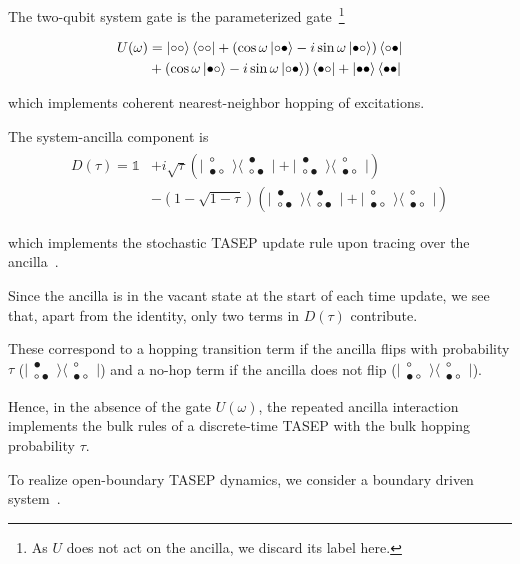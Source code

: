 \documentclass[aps,prl,twocolumn,groupedaddress,superscriptaddress,colorlinks,bookmarks=false,citecolor=darkspringgreen,linkcolor=darkolivegreen,urlcolor=navyblue]{revtex4-1}
\newcommand{\threestate}[3]{
\begin{matrix}
#1\\[-.25cm]
#2#3
\end{matrix}
}
\newcommand{\kett}[1]{\lvert #1 \rangle}
\newcommand{\brat}[1]{\langle #1 \rvert}
\begin{document}
The two-qubit system gate is the parameterized gate~\footnote{As $U$ does not act on the ancilla, we discard its label here.}


\begin{align}
\begin{split}
U(\omega)
&=\ket{\circ\circ}\bra{\circ\circ}+ (\cos\omega \ket{\circ\bullet} - i\sin\omega\ket{\bullet\circ})\bra{\circ\bullet}\\
&+(\cos\omega \ket{\bullet\circ} - i\sin\omega \ket{\circ\bullet})\bra{\bullet\circ} + \ket{\bullet\bullet}\bra{\bullet\bullet}
\end{split}
\end{align}


which implements coherent nearest-neighbor hopping of excitations.


The system-ancilla component is
\begin{align}
\begin{split}
D(\tau)
=\mathds{1} &+ i\sqrt{\tau}(\kett{\threestate{\circ}{\bullet}{\circ}}\brat{\threestate{\bullet}{\circ}{\bullet}}
+\kett{\threestate{\bullet}{\circ}{\bullet}}\brat{\threestate{\circ}{\bullet}{\circ}})\\
&- (1-\sqrt{1-\tau})(\kett{\threestate{\bullet}{\circ}{\bullet}}\brat{\threestate{\bullet}{\circ}{\bullet}}+ \kett{\threestate{\circ}{\bullet}{\circ}}\brat{\threestate{\circ}{\bullet}{\circ}})
\end{split}
\end{align}


which implements the stochastic TASEP update rule upon tracing over the ancilla~\cite{SM}.

Since the ancilla is in the vacant state at the start of each time update, we see that, apart from the identity, only two terms in $D(\tau)$ contribute.

These correspond to a hopping transition term if the ancilla flips with probability $\tau$ ($\kett{\threestate{\bullet}{\circ}{\bullet}}\brat{\threestate{\circ}{\bullet}{\circ}}$) and a no-hop term if the ancilla does not flip
($\kett{\threestate{\circ}{\bullet}{\circ}}\brat{\threestate{\circ}{\bullet}{\circ}}$).

Hence, in the absence of the gate $U(\omega)$, the repeated ancilla interaction implements the bulk rules of a discrete-time TASEP with the bulk hopping probability $\tau$.

To realize open-boundary TASEP dynamics, we consider a boundary driven system~\cite{Prosen11,Karevski13,Caro18,Prosen11,Zni14,Zni14b,Ilievski2014}.
\end{document}
